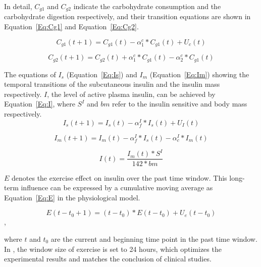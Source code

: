 
In detail, $C_{g1}$  and $C_{g2}$ indicate the carbohydrate consumption and the carbohydrate digestion respectively, and their transition equations are shown 
in Equation~\ref{Eq:Cg1} and Equation~\ref{Eq:Cg2}.

\begin{equation}\label{Eq:Cg1}
C_{g1}(t+1)=C_{g1}(t)-\alpha_{1}^c*C_{g1}(t)+U_{c}(t)
\end{equation}

\begin{equation}\label{Eq:Cg2}
C_{g2}(t+1)=C_{g2}(t)+\alpha_{1}^c*C_{g1}(t)-\alpha_{2}^c*C_{g1}(t)
\end{equation}

The equations of $I_{s}$ (Equation~\ref{Eq:Is}) and $I_{m}$ (Equation~\ref{Eq:Im}) showing the temporal transitions of  the subcutaneous insulin
and the insulin mass respectively. $I$, the level of active plasma insulin, can be achieved by Equation~\ref{Eq:I}, where $S^I$ and $bm$ refer to the 
insulin sensitive and body mass respectively. 
\begin{equation}\label{Eq:Is}
I_{s}(t+1)=I_{s}(t)-\alpha_{f}^I*I_{s}(t)+U_{I}(t)
\end{equation}


\begin{equation}\label{Eq:Im}
I_{m}(t+1)=I_{m}(t)-\alpha_{f}^I*I_{s}(t)-\alpha_c^I*I_{m}(t)
\end{equation}

\begin{equation}\label{Eq:I}
I(t)=\frac{I_{m}(t)*S^I}{142*bm}
\end{equation}

$E$ denotes the exercise effect on insulin over the past time window. This long-term influence can be 
expressed by a cumulative moving average as Equation~\ref{Eq:E} in the physiological model. 

\begin{equation}\label{Eq:E}
E(t-t_0+1)=(t-t_0)*E(t-t_0)+U_{e}(t-t_0)
\end{equation},

where $t$ and $t_0$ are the current and beginning time point in the past time window. In \sysname, 
the window size of exercise is set to 24 hours, which optimizes the experimental results and matches the conclusion
of clinical studies. 


